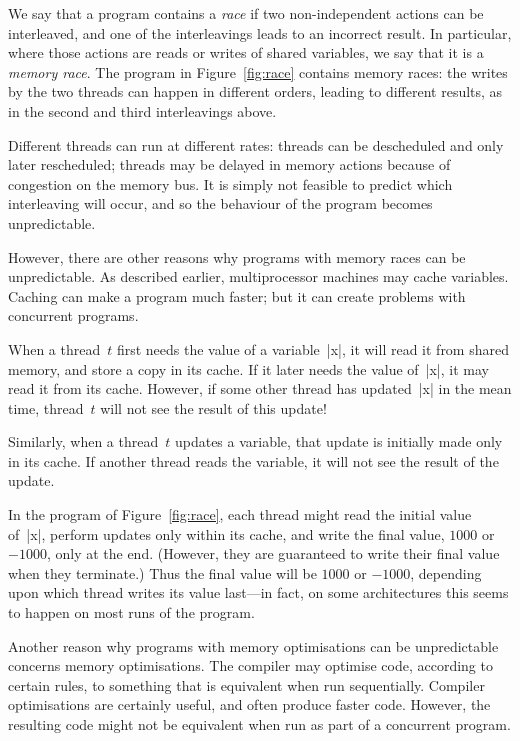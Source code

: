 We say that a program contains a \emph{race} if two non-independent actions
can be interleaved, and one of the interleavings leads to an incorrect result.
In particular, where those actions are reads or writes of shared variables, we
say that it is a \emph{memory race}.  The program in Figure~\ref{fig:race}
contains memory races: the writes by the two threads can happen in different
orders, leading to different results, as in the second and third interleavings
above.

Different threads can run at different rates: threads can be descheduled and
only later rescheduled; threads may be delayed in memory actions because of
congestion on the memory bus.  It is simply not feasible to predict which
interleaving will occur, and so the behaviour of the program becomes
unpredictable. 


However, there are other reasons why programs with memory races can be
unpredictable.  
%
As described earlier, multiprocessor machines may cache variables.  Caching
can make a program much faster; but it can create problems with concurrent
programs.

When a thread~$t$ first needs the value of a variable~|x|, it will read it
from shared memory, and store a copy in its cache.  If it later needs the
value of~|x|, it may read it from its cache.  However, if some other thread
has updated~|x| in the mean time, thread~$t$ will not see the result of this
update!

Similarly, when a thread~$t$ updates a variable, that update is initially made
only in its cache.  If another thread reads the variable, it will not see the
result of the update.

In the program of Figure~\ref{fig:race}, each thread might read the initial
value of~|x|, perform updates only within its cache, and write the final
value, $1000$ or $-1000$, only at the end.  (However, they are guaranteed to
write their final value when they terminate.)  Thus the final value will be
$1000$ or $-1000$, depending upon which thread writes its value last---in
fact, on some architectures this seems to happen on most runs of the program.


Another reason why programs with memory optimisations can be unpredictable
concerns memory optimisations.  The compiler may optimise code, according to
certain rules, to something that is equivalent when run sequentially.
Compiler optimisations are certainly useful, and often produce faster code.
However, the resulting code might not be equivalent when run as part of a
concurrent program.

